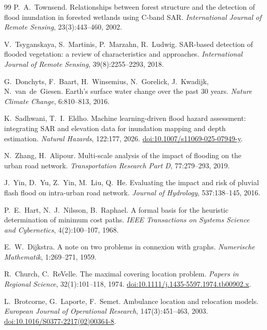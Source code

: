 \documentclass[journal]{IEEEtran}
\begin{document}
\begin{thebibliography}{99}
P.~A.~Townsend.
Relationships between forest structure and the detection of flood inundation in
forested wetlands using C-band SAR.
\emph{International Journal of Remote Sensing}, 23(3):443--460, 2002.

V.~Tsyganskaya, S.~Martinis, P.~Marzahn, R.~Ludwig.
SAR-based detection of flooded vegetation: a review of characteristics and
approaches.
\emph{International Journal of Remote Sensing}, 39(8):2255--2293, 2018.

G.~Donchyts, F.~Baart, H.~Winsemius, N.~Gorelick, J.~Kwadijk, N.~van~de~Giesen.
Earth's surface water change over the past 30 years.
\emph{Nature Climate Change}, 6:810--813, 2016.

K.~Sadhwani, T.~I.~Eldho.
Machine learning-driven flood hazard assessment: integrating SAR and elevation
data for inundation mapping and depth estimation.
\emph{Natural Hazards}, 122:177, 2026.
\href{https://doi.org/10.1007/s11069-025-07949-y}{doi:10.1007/s11069-025-07949-y}.

N.~Zhang, H.~Alipour.
Multi-scale analysis of the impact of flooding on the urban road network.
\emph{Transportation Research Part D}, 77:279--293, 2019.

J.~Yin, D.~Yu, Z.~Yin, M.~Liu, Q.~He.
Evaluating the impact and risk of pluvial flash flood on intra-urban road network.
\emph{Journal of Hydrology}, 537:138--145, 2016.

P.~E.~Hart, N.~J.~Nilsson, B.~Raphael.
A formal basis for the heuristic determination of minimum cost paths.
\emph{IEEE Transactions on Systems Science and Cybernetics}, 4(2):100--107, 1968.

E.~W.~Dijkstra.
A note on two problems in connexion with graphs.
\emph{Numerische Mathematik}, 1:269--271, 1959.

R.~Church, C.~ReVelle.
The maximal covering location problem.
\emph{Papers in Regional Science}, 32(1):101--118, 1974.
\href{https://doi.org/10.1111/j.1435-5597.1974.tb00902.x}{doi:10.1111/j.1435-5597.1974.tb00902.x}.

L.~Brotcorne, G.~Laporte, F.~Semet.
Ambulance location and relocation models.
\emph{European Journal of Operational Research}, 147(3):451--463, 2003.
\href{https://doi.org/10.1016/S0377-2217(02)00364-8}{doi:10.1016/S0377-2217(02)00364-8}.


\end{thebibliography}
\end{document}
